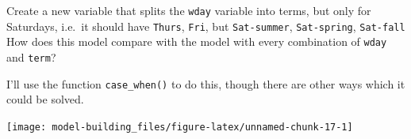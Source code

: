 \documentclass[]{book}
\newenvironment{Shaded}{\begin{snugshade}}{\end{snugshade}}
\newcommand{\DataTypeTok}[1]{\textcolor[rgb]{0.13,0.29,0.53}{#1}}
\newcommand{\FloatTok}[1]{\textcolor[rgb]{0.00,0.00,0.81}{#1}}
\newcommand{\KeywordTok}[1]{\textcolor[rgb]{0.13,0.29,0.53}{\textbf{#1}}}
\newcommand{\NormalTok}[1]{#1}
\newcommand{\OperatorTok}[1]{\textcolor[rgb]{0.81,0.36,0.00}{\textbf{#1}}}
\newcommand{\OtherTok}[1]{\textcolor[rgb]{0.56,0.35,0.01}{#1}}
\newcommand{\StringTok}[1]{\textcolor[rgb]{0.31,0.60,0.02}{#1}}
\theoremstyle{plain}
\theoremstyle{remark}
\begin{document}
Create a new variable that splits the \texttt{wday} variable into terms, but only for Saturdays, i.e.~it should have \texttt{Thurs}, \texttt{Fri}, but \texttt{Sat-summer}, \texttt{Sat-spring}, \texttt{Sat-fall} How does this model compare with the model with every combination of \texttt{wday} and \texttt{term}?

I'll use the function \texttt{case\_when()} to do this, though there are other ways which it could be solved.

\begin{Shaded}
\end{Shaded}

\begin{Shaded}
\end{Shaded}

\begin{center}\texttt{[image: model-building\_files/figure-latex/unnamed-chunk-17-1]} \end{center}
\end{document}
